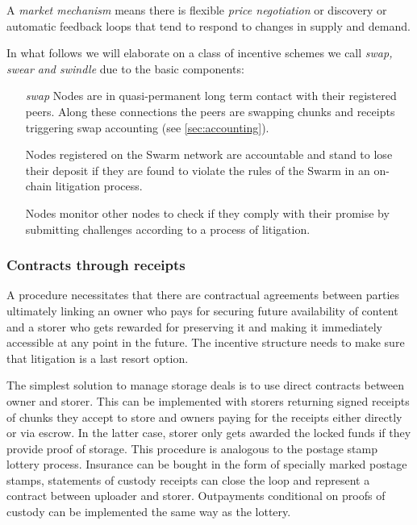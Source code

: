 A \emph{market mechanism} means there is flexible \emph{price negotiation} or discovery or automatic feedback loops that tend to respond to changes in supply and demand.

In what follows we will elaborate on a class of incentive schemes we call \emph{swap, swear and swindle} due to the basic components:

\begin{itemize}
\item [\emph{swap}]
  Nodes are in quasi-permanent long term contact with their registered peers. Along these connections the peers are swapping chunks and receipts triggering swap accounting (see \ref{sec:accounting}).
  
\item [\gloss{swear}]
  Nodes registered on the Swarm network are accountable and stand to lose their deposit if they are found to violate the rules of the Swarm in an on-chain litigation process.

\item [\gloss{swindle}]
  Nodes monitor other nodes to check if they comply with their promise by submitting challenges according to a process of litigation.

\end{itemize}

\subsubsection{Contracts through receipts}

A  procedure necessitates that there are contractual agreements between parties ultimately linking an owner who pays for securing future availability of content and a storer who gets rewarded for preserving it and making it immediately accessible at any point in the future. The incentive structure needs to make sure that litigation is a last resort option.

The simplest solution to manage storage deals is to use direct contracts between owner and storer. This can be implemented with storers returning signed receipts of chunks they accept to store and owners paying for the receipts either directly or via escrow. In the latter case, storer only gets awarded the locked funds if they provide proof of storage. This procedure is analogous to the postage stamp lottery process. Insurance can be bought in the form of specially marked postage stamps, statements of custody receipts can close the loop and represent a contract between uploader and storer. Outpayments conditional on proofs of custody can be implemented the same way as the lottery.

